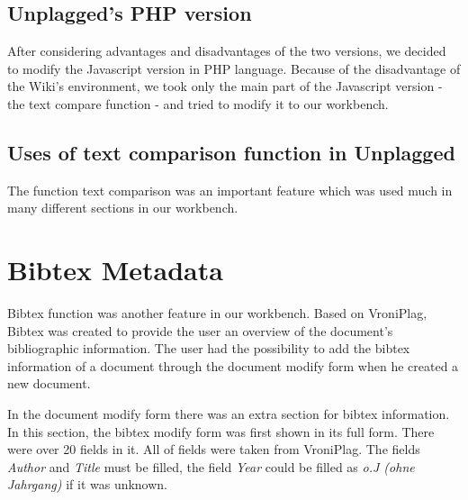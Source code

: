 \subsection{Unplagged’s PHP version}
After considering advantages and disadvantages of the two versions, we decided to modify the Javascript version in PHP language. Because of the disadvantage of the Wiki’s environment, we took only the main part of the Javascript version - the text compare function - and tried to modify it to our workbench.







\subsection{Uses of text comparison function in Unplagged}
The function text comparison was an important feature which was used much in many different sections in our workbench.







\pagebreak

\section{Bibtex Metadata}

Bibtex function was another feature in our workbench. Based on VroniPlag, Bibtex was created to provide the user an overview of the document's bibliographic information. The user had the possibility to add the bibtex information of a document through the document modify form when he created a new document. 

In the document modify form there was an extra section for bibtex information. In this section, the bibtex modify form was first shown in its full form. There were over 20 fields in it. All of fields were taken from VroniPlag. The fields \textit{Author} and \textit{Title} must be filled, the field \textit{Year} could be filled as \textit{o.J (ohne Jahrgang)} if it was unknown.

